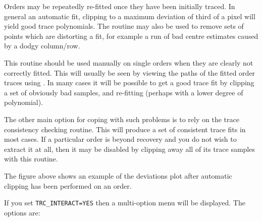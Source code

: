 \documentclass[twoside,11pt,nolof]{starlink}
\newcommand{\sunspec}[2]{#2}
\newcommand{\myindex}[1]{\index{#1}}
\begin{document}
Orders may be repeatedly re-fitted once they have been initially traced.
In general an automatic fit, clipping to a maximum deviation of third of
a pixel will yield good trace polynomials. The routine may also be used
to remove sets of points which are distorting a fit, for example a run
of bad centre estimates caused by a dodgy column/row.

This routine should be used manually on single orders when they are
clearly not correctly fitted. This will usually be seen by viewing the
paths of the fitted order traces using
\@. In many cases
it will be possible to get a good trace fit by clipping a set of obviously
bad samples, and re-fitting (perhaps with a lower degree of polynomial).

The other main option for coping with such problems is to rely on the trace
consistency checking routine.  This will produce a set of consistent
trace fits in most cases.
\myindex{Order!disabling}
If a particular order is beyond recovery and you do not wish to extract it
at all, then it may be disabled by clipping away all of its trace samples
with this routine.

\sunspec{Figure~\ref{fi_tclip}}{The figure above}
shows an example of the deviations plot after
automatic clipping has been performed on an order.

If you set {\tt TRC\_INTERACT=YES} then a multi-option menu will be displayed.
The options are:
\end{document}
